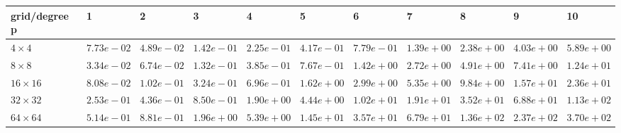 \begin{tabular}{lllllllllll}
\hline
 grid/degree p   & 1          & 2          & 3          & 4          & 5          & 6          & 7          & 8          & 9          & 10         \\
\hline
 $4 \times 4$    & $7.73e-02$ & $4.89e-02$ & $1.42e-01$ & $2.25e-01$ & $4.17e-01$ & $7.79e-01$ & $1.39e+00$ & $2.38e+00$ & $4.03e+00$ & $5.89e+00$ \\
 $8 \times 8$    & $3.34e-02$ & $6.74e-02$ & $1.32e-01$ & $3.85e-01$ & $7.67e-01$ & $1.42e+00$ & $2.72e+00$ & $4.91e+00$ & $7.41e+00$ & $1.24e+01$ \\
 $16 \times 16$  & $8.08e-02$ & $1.02e-01$ & $3.24e-01$ & $6.96e-01$ & $1.62e+00$ & $2.99e+00$ & $5.35e+00$ & $9.84e+00$ & $1.57e+01$ & $2.36e+01$ \\
 $32 \times 32$  & $2.53e-01$ & $4.36e-01$ & $8.50e-01$ & $1.90e+00$ & $4.44e+00$ & $1.02e+01$ & $1.91e+01$ & $3.52e+01$ & $6.88e+01$ & $1.13e+02$ \\
 $64 \times 64$  & $5.14e-01$ & $8.81e-01$ & $1.96e+00$ & $5.39e+00$ & $1.45e+01$ & $3.57e+01$ & $6.79e+01$ & $1.36e+02$ & $2.37e+02$ & $3.70e+02$ \\
\hline
\end{tabular}